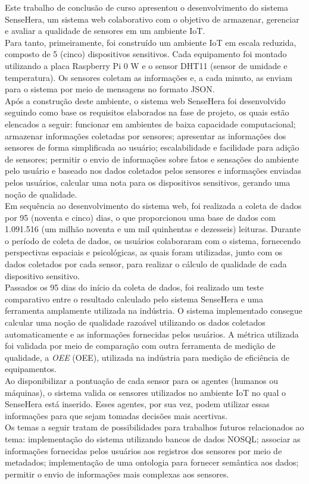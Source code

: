 \null \quad Este trabalho de conclusão de curso apresentou o desenvolvimento do sistema SenseHera, um sistema web colaborativo com o objetivo de armazenar, gerenciar e avaliar a qualidade de sensores em um ambiente \acrlong{IoT}.
\\\null \quad Para tanto, primeiramente, foi construído um ambiente \acrshort{IoT} em escala reduzida, composto de 5 (cinco) dispositivos sensitivos. Cada equipamento foi montado utilizando a placa Raspberry Pi 0 W e o sensor DHT11 (sensor de umidade e temperatura). Os sensores coletam as informações e, a cada minuto, as enviam para o sistema por meio de mensagens no formato JSON.
\\\null \quad Após a construção deste ambiente, o sistema web SenseHera foi desenvolvido seguindo como base os requisitos elaborados na fase de projeto, os quais estão elencados a seguir: funcionar em ambientes de baixa capacidade computacional; armazenar informações coletadas por sensores; apresentar as informações dos sensores de forma simplificada ao usuário; escalabilidade e facilidade para adição de sensores; permitir o envio de informações sobre fatos e sensações do ambiente pelo usuário e baseado nos dados coletados pelos sensores e informações enviadas pelos usuários, calcular uma nota para os dispositivos sensitivos, gerando uma noção de qualidade.
\\\null \quad Em sequência ao desenvolvimento do sistema web, foi realizada a coleta de dados por 95 (noventa e cinco) dias, o que proporcionou uma base de dados com 1.091.516 (um milhão noventa e um mil quinhentas e dezesseis) leituras. Durante o período de coleta de dados, os usuários colaboraram com o sistema, fornecendo perspectivas espaciais e psicológicas, as quais foram utilizadas, junto com os dados coletados por cada sensor, para realizar o cálculo de qualidade de cada dispositivo sensitivo.
 \\\null \quad Passados os 95 dias do início da coleta de dados, foi realizado um teste comparativo entre o resultado calculado pelo sistema SenseHera e uma ferramenta amplamente utilizada na indústria.
 O sistema implementado consegue calcular uma noção de qualidade razoável utilizando os dados coletados automaticamente e as informações fornecidas pelos usuários. A métrica utilizada foi validada por meio de comparação com outra ferramenta de medição de qualidade, a \textit{\acrlong{OEE}} (\acrshort{OEE}), utilizada na indústria para medição de eficiência de equipamentos.
 \\\null\quad Ao disponibilizar a pontuação de cada sensor para os agentes (humanos ou máquinas), o sistema valida os sensores utilizados no ambiente \acrshort{IoT} no qual o SenseHera está inserido. Esses agentes, por sua vez, podem utilizar essas informações para que sejam tomadas decisões mais acertivas.
\\\null \quad Os temas a seguir tratam de possibilidades para trabalhos futuros relacionados ao tema: implementação do sistema utilizando bancos de dados NOSQL; associar as informações fornecidas pelos usuários aos registros dos sensores por meio de metadados; implementação de uma ontologia para fornecer semântica aos dados; permitir o envio de informações mais complexas aos sensores.
